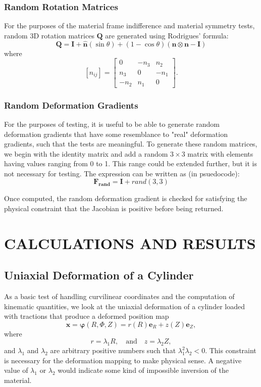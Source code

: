 \documentclass[]{spie}  %
\begin{document}
\subsubsection{Random Rotation Matrices}
For the purposes of the material frame indifference and material symmetry tests, random 3D rotation matrices $\bm{Q}$ are generated using Rodrigues' formula:
\begin{equation}
\label{eq: random rotation}
	\bm{Q} = \bm{I} + \bm{\hat{n}}(\sin\theta)  + (1 - \cos\theta)(\bm{n} \otimes \bm{n} - \bm{I})
\end{equation}
where
\begin{equation}
	\left[\hat{n}_{ij}\right] = 
	\begin{bmatrix}
		0		&	-n_3	&	n_2 \\
		n_3		&	0		&	-n_1 \\
		-n_2	& 	n_1		& 0
	\end{bmatrix} .
\end{equation}

\subsubsection{Random Deformation Gradients}
For the purposes of testing, it is useful to be able to generate random deformation gradients that have some resemblance to "real" deformation gradients, such that the tests are meaningful. To generate these random matrices, we begin with the identity matrix and add a random $3 \times 3$ matrix with elements having values ranging from 0 to 1. This range could be extended further, but it is not necessary for testing. The expression can be written as (in psuedocode):
\begin{equation}
\label{eq: random deformation gradient}
	\bm{F_{rand}} = \bm{I} + rand(3,3)
\end{equation}

Once computed, the random deformation gradient is checked for satisfying the physical constraint that the Jacobian is positive before being returned. 

	
\section{CALCULATIONS AND RESULTS} 

\subsection{Uniaxial Deformation of a Cylinder}
As a basic test of handling curvilinear coordinates and the computation of kinematic quantities, we look at the uniaxial deformation of a cylinder loaded with tractions that produce a deformed position map
\[
\bm{x} = \bm{\varphi}(R,\Phi,Z) = r(R) \bm{e}_R + z(Z) \bm{e}_Z ,
\]
where 
\[
r = \lambda_1 R, \quad \text{and} \quad z = \lambda_2 Z,
\]
and $\lambda_1$ and $\lambda_2$ are arbitrary positive numbers such that $\lambda_1^2\lambda_2<0$. This constraint is necessary for the deformation mapping to make physical sense. A negative value of $\lambda_1$ or $\lambda_2$ would indicate some kind of impossible inversion of the material. 
\end{document}
